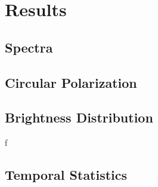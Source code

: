 \section{Results}

\subsection{Spectra}


\subsection{Circular Polarization}


\subsection{Brightness Distribution}f


\subsection{Temporal Statistics}